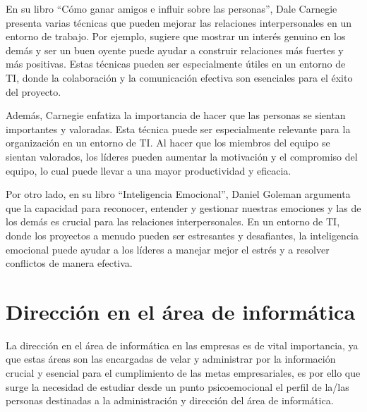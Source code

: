 \documentclass[journal]{IEEEtran}
\begin{document}
En su libro “Cómo ganar amigos e influir sobre las personas”, Dale Carnegie presenta varias técnicas que pueden mejorar las relaciones interpersonales en un entorno de trabajo. Por ejemplo, sugiere que mostrar un interés genuino en los demás y ser un buen oyente puede ayudar a construir relaciones más fuertes y más positivas. Estas técnicas pueden ser especialmente útiles en un entorno de TI, donde la colaboración y la comunicación efectiva son esenciales para el éxito del proyecto.

Además, Carnegie enfatiza la importancia de hacer que las personas se sientan importantes y valoradas. Esta técnica puede ser especialmente relevante para la organización en un entorno de TI. Al hacer que los miembros del equipo se sientan valorados, los líderes pueden aumentar la motivación y el compromiso del equipo, lo cual puede llevar a una mayor productividad y eficacia.

Por otro lado, en su libro “Inteligencia Emocional”, Daniel Goleman argumenta que la capacidad para reconocer, entender y gestionar nuestras emociones y las de los demás es crucial para las relaciones interpersonales. En un entorno de TI, donde los proyectos a menudo pueden ser estresantes y desafiantes, la inteligencia emocional puede ayudar a los líderes a manejar mejor el estrés y a resolver conflictos de manera efectiva.


\section{Dirección en el área de informática}
La dirección en el área de informática en las empresas es de vital importancia, ya que estas áreas son las encargadas de velar y administrar por la información crucial y esencial para el cumplimiento de las metas empresariales, es por ello que surge la necesidad de estudiar desde un punto psicoemocional el perfil de la/las personas destinadas a la administración y dirección del área de informática.
\end{document}
